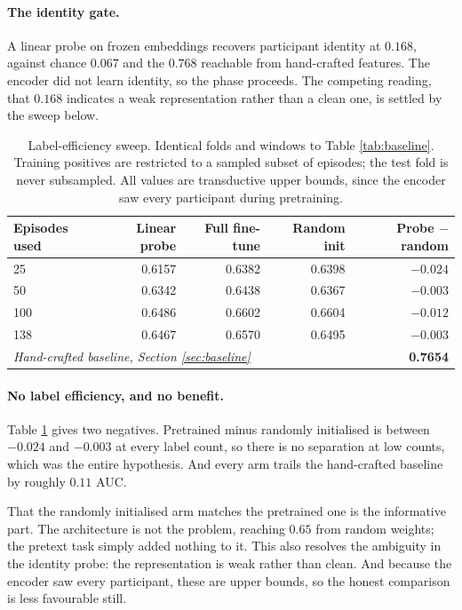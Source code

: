 \documentclass{article}
\begin{document}
\paragraph{The identity gate.} A linear probe on frozen embeddings recovers
participant identity at $0.168$, against chance $0.067$ and the $0.768$
reachable from hand-crafted features. The encoder did not learn identity, so
the phase proceeds. The competing reading, that $0.168$ indicates a weak
representation rather than a clean one, is settled by the sweep below.

\begin{table}[t]
\caption{Label-efficiency sweep. Identical folds and windows to Table
\ref{tab:baseline}. Training positives are restricted to a sampled subset of
episodes; the test fold is never subsampled. All values are transductive upper
bounds, since the encoder saw every participant during pretraining.}
\label{tab:ssl}
\centering
\begin{tabular}{lrrrr}
\toprule
Episodes used & Linear probe & Full fine-tune & Random init & Probe $-$ random \\
\midrule
25  & 0.6157 & 0.6382 & 0.6398 & $-0.024$ \\
50  & 0.6342 & 0.6438 & 0.6367 & $-0.003$ \\
100 & 0.6486 & 0.6602 & 0.6604 & $-0.012$ \\
138 & 0.6467 & 0.6570 & 0.6495 & $-0.003$ \\
\midrule
\multicolumn{4}{l}{\emph{Hand-crafted baseline, Section \ref{sec:baseline}}}
  & \textbf{0.7654} \\
\bottomrule
\end{tabular}
\end{table}

\paragraph{No label efficiency, and no benefit.} Table \ref{tab:ssl} gives
two negatives. Pretrained minus randomly initialised is between $-0.024$ and
$-0.003$ at every label count, so there is no separation at low counts, which
was the entire hypothesis. And every arm trails the hand-crafted baseline by
roughly $0.11$ AUC.

That the randomly initialised arm matches the pretrained one is the
informative part. The architecture is not the problem, reaching $0.65$ from
random weights; the pretext task simply added nothing to it. This also
resolves the ambiguity in the identity probe: the representation is weak
rather than clean. And because the encoder saw every participant, these are
upper bounds, so the honest comparison is less favourable still.
\end{document}
